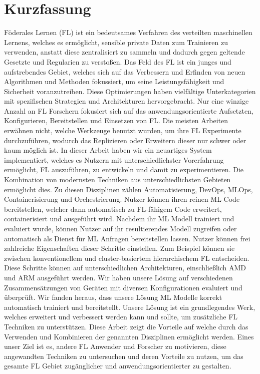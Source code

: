 \chapter{Kurzfassung}

Föderales Lernen (FL) ist ein bedeutsames Verfahren des verteilten maschinellen Lernens, welches es ermöglicht, sensible private Daten zum Trainieren zu verwenden, anstatt diese zentralisiert zu sammeln und dadurch gegen geltende Gesetzte und Regularien zu verstoßen.
Das Feld des FL ist ein junges und aufstrebendes Gebiet, welches sich auf das Verbessern und Erfinden von neuen Algorithmen und Methoden fokussiert, um seine Leistungsfähigkeit und Sicherheit voranzutreiben.
Diese Optimierungen haben vielfältige Unterkategorien mit spezifischen Strategien und Architekturen hervorgebracht.
Nur eine winzige Anzahl an FL Forschern fokusiert sich auf das anwendungsorientierte Aufsetzten, Konfigurieren, Bereitstellen und Einsetzen von FL.
Die meisten Arbeiten erwähnen nicht, welche Werkzeuge benutzt wurden, um ihre FL Experimente durchzuführen, wodurch das Replizieren oder Erweitern dieser nur schwer oder kaum möglich ist.
In dieser Arbeit haben wir ein neuartiges System implementiert, welches es Nutzern mit unterschiedlichster Vorerfahrung ermöglicht, FL auszuführen, zu entwickeln und damit zu experimentieren.
Die Kombination von modernsten Techniken aus unterschiedlichsten Gebieten ermöglicht dies.
Zu diesen Disziplinen zählen Automatisierung, DevOps, MLOps, Containerisierung und Orchestrierung.
Nutzer können ihren reinen ML Code bereitstellen, welcher dann automatisch zu FL-fähigem Code erweitert, containerisiert und ausgeführt wird.
Nachdem ihr ML Modell trainiert und evaluiert wurde, können Nutzer auf ihr resultierendes Modell zugreifen oder automatisch als Dienst für ML Anfragen bereitstellen lassen.
Nutzer können frei zahlreiche Eigenschaften dieser Schritte einstellen.
Zum Beispiel können sie zwischen konventionellem und cluster-basiertem hierarchischem FL entscheiden.
Diese Schritte können auf unterschiedlichen Architekturen, einschließlich AMD und ARM ausgeführt werden.
Wir haben unsere Lösung auf verschiedenen Zusammensätzungen von Geräten mit diversen Konfigurationen evaluiert und überprüft.
Wir fanden heraus, dass unsere Lösung ML Modelle korrekt automatisch trainiert und bereitstellt.
Unsere Lösung ist ein grundlegendes Werk, welches erweitert und verbessert werden kann und sollte, um zusätzliche FL Techniken zu unterstützen.
Diese Arbeit zeigt die Vorteile auf welche durch das Verwenden und Kombinieren der genannten Disziplinen ermöglicht werden.
Eines unser Ziel ist es, andere FL Anwender und Forscher zu motivieren, diese angewandten Techniken zu untersuchen und deren Vorteile zu nutzen, um das gesamte FL Gebiet zugänglicher und anwendungsorientierter zu gestalten.
